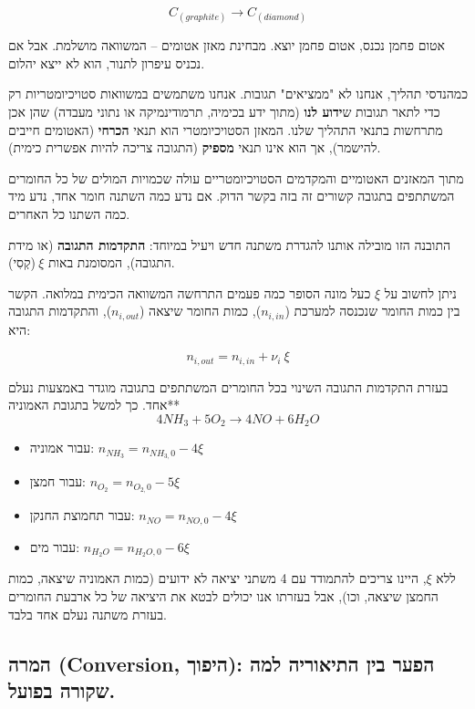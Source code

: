 \documentclass[
  hebrew,
  letterpaper,
  DIV=11,
  numbers=noendperiod]{scrreprt}
\begin{document}
\[C_{(graphite)} \rightarrow C_{(diamond)}\]

אטום פחמן נכנס, אטום פחמן יוצא. מבחינת מאזן אטומים -- המשוואה מושלמת.
אבל אם נכניס עיפרון לתנור, הוא לא ייצא יהלום.

כמהנדסי תהליך, אנחנו לא "ממציאים" תגובות. אנחנו משתמשים במשוואות
סטויכיומטריות רק כדי לתאר תגובות ש\textbf{ידוע לנו} (מתוך ידע בכימיה,
תרמודינמיקה או נתוני מעבדה) שהן אכן מתרחשות בתנאי התהליך שלנו. המאזן
הסטויכיומטרי הוא תנאי \textbf{הכרחי} (האטומים חייבים להישמר), אך הוא
אינו תנאי \textbf{מספיק} (התגובה צריכה להיות אפשרית כימית).

מתוך המאזנים האטומיים והמקדמים הסטויכיומטריים עולה שכמויות המולים של כל
החומרים המשתתפים בתגובה קשורים זה בזה בקשר הדוק. אם נדע כמה השתנה חומר
אחד, נדע מיד כמה השתנו כל האחרים.

התובנה הזו מובילה אותנו להגדרת משתנה חדש ויעיל במיוחד: \textbf{התקדמות
התגובה} (או \textquotesingle מידת התגובה\textquotesingle), המסומנת באות
\(\ \xi\)(קְסִי).

ניתן לחשוב על \(\xi\) כעל מונה הסופר \textquotesingle כמה פעמים התרחשה
המשוואה הכימית\textquotesingle{} במלואה. הקשר בין כמות החומר שנכנסה
למערכת (\(n_{i,in}\)), כמות החומר שיצאה (\(n_{i,out}\)), והתקדמות התגובה
היא:

\[n_{i,out} = n_{i,in} + \nu_{i}\ \xi\]

בעזרת התקדמות התגובה השינוי בכל החומרים המשתתפים בתגובה מוגדר באמצעות
נעלם אחד. כך למשל בתגובת האמוניה**
\[4{NH}_{3} + 5O_{2} \longrightarrow 4NO + 6H_{2}O\]

\begin{itemize}
\item
  עבור אמוניה: \(n_{NH_{3}} = n_{NH_{3,}0} - 4\xi\ \)
\item
  עבור חמצן: \(n_{O_{2}} = n_{O_{2,}0} - 5\xi\)
\item
  עבור תחמוצת החנקן: \(n_{NO} = n_{NO,0} - 4\xi\)
\item
  עבור מים: \(n_{H_{2}O} = n_{H_{2}O,0} - 6\xi\)
\end{itemize}

ללא \(\xi\), היינו צריכים להתמודד עם 4 משתני יציאה לא ידועים (כמות
האמוניה שיצאה, כמות החמצן שיצאה, וכו\textquotesingle), אבל בעזרתו אנו
יכולים לבטא את היציאה של כל ארבעת החומרים בעזרת משתנה נעלם אחד בלבד.

\subsection{המרה (Conversion, היפוך): הפער בין התיאוריה למה שקורה
בפועל.}\label{ux5d4ux5deux5e8ux5d4-conversion-ux5d4ux5d9ux5e4ux5d5ux5da-ux5d4ux5e4ux5e2ux5e8-ux5d1ux5d9ux5df-ux5d4ux5eaux5d9ux5d0ux5d5ux5e8ux5d9ux5d4-ux5dcux5deux5d4-ux5e9ux5e7ux5d5ux5e8ux5d4-ux5d1ux5e4ux5d5ux5e2ux5dc.}
\end{document}
